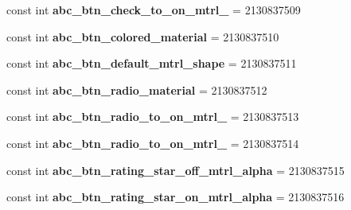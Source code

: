 \begin{DoxyCompactItemize}
const int {\bfseries abc\+\_\+btn\+\_\+check\+\_\+to\+\_\+on\+\_\+mtrl\+\_} = 2130837509
\item 
\mbox{\label{class_sample_app_1_1_droid_1_1_resource_1_1_drawable_a5d5b6761340e514a9d3b1bc3184e49e4}} 
const int {\bfseries abc\+\_\+btn\+\_\+colored\+\_\+material} = 2130837510
\item 
\mbox{\label{class_sample_app_1_1_droid_1_1_resource_1_1_drawable_a5012b50e588603ad920c27cc4696aaa7}} 
const int {\bfseries abc\+\_\+btn\+\_\+default\+\_\+mtrl\+\_\+shape} = 2130837511
\item 
\mbox{\label{class_sample_app_1_1_droid_1_1_resource_1_1_drawable_a89ce430a9fc1a7ee24ffbe01a84d4ccd}} 
const int {\bfseries abc\+\_\+btn\+\_\+radio\+\_\+material} = 2130837512
\item 
\mbox{\label{class_sample_app_1_1_droid_1_1_resource_1_1_drawable_ab5d4dcec21553e3fa7489e73120e097c}} 
const int {\bfseries abc\+\_\+btn\+\_\+radio\+\_\+to\+\_\+on\+\_\+mtrl\+\_} = 2130837513
\item 
\mbox{\label{class_sample_app_1_1_droid_1_1_resource_1_1_drawable_a0b7d76d3ab1f3cc463162fa976ce823f}} 
const int {\bfseries abc\+\_\+btn\+\_\+radio\+\_\+to\+\_\+on\+\_\+mtrl\+\_} = 2130837514
\item 
\mbox{\label{class_sample_app_1_1_droid_1_1_resource_1_1_drawable_a7177a77ed3e23c0f7ea096f5406d7bee}} 
const int {\bfseries abc\+\_\+btn\+\_\+rating\+\_\+star\+\_\+off\+\_\+mtrl\+\_\+alpha} = 2130837515
\item 
\mbox{\label{class_sample_app_1_1_droid_1_1_resource_1_1_drawable_a5978d32a902d5ac8bd3d8cf833b6d1cd}} 
const int {\bfseries abc\+\_\+btn\+\_\+rating\+\_\+star\+\_\+on\+\_\+mtrl\+\_\+alpha} = 2130837516
\item 
\mbox{\label{class_sample_app_1_1_droid_1_1_resource_1_1_drawable_a7192f97acf463c2f1a6e224d77c7b5ae}} 

\end{DoxyCompactItemize}
